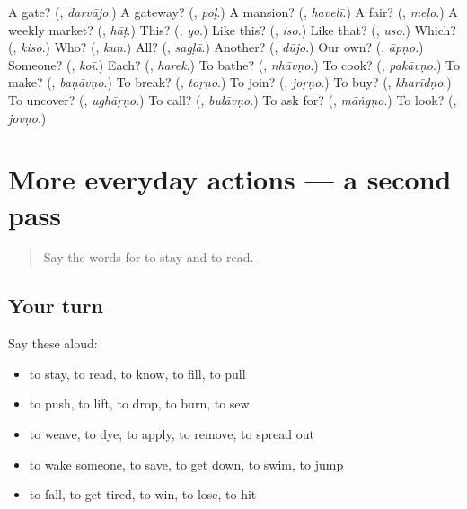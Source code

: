 \begin{tcolorbox}[breakable,colback=teal!4,colframe=teal!35!black,title={Before you move on}]
A gate? (\textbf{}, \emph{darvājo}.) A gateway? (\textbf{}, \emph{poḷ}.) A mansion? (\textbf{}, \emph{havelī}.) A fair? (\textbf{}, \emph{meḷo}.) A weekly market? (\textbf{}, \emph{hāṭ}.) This? (\textbf{}, \emph{yo}.) Like this? (\textbf{}, \emph{iso}.) Like that? (\textbf{}, \emph{uso}.) Which? (\textbf{}, \emph{kiso}.) Who? (\textbf{}, \emph{kuṇ}.) All? (\textbf{}, \emph{sagḷā}.) Another? (\textbf{}, \emph{dūjo}.) Our own? (\textbf{}, \emph{āpṇo}.) Someone? (\textbf{}, \emph{koī}.) Each? (\textbf{}, \emph{harek}.) To bathe? (\textbf{}, \emph{nhāvṇo}.) To cook? (\textbf{}, \emph{pakāvṇo}.) To make? (\textbf{}, \emph{baṇāvṇo}.) To break? (\textbf{}, \emph{toṛṇo}.) To join? (\textbf{}, \emph{joṛṇo}.) To buy? (\textbf{}, \emph{kharīdṇo}.) To uncover? (\textbf{}, \emph{ughāṛṇo}.) To call? (\textbf{}, \emph{bulāvṇo}.) To ask for? (\textbf{}, \emph{māṅgṇo}.) To look? (\textbf{}, \emph{jovṇo}.)
\end{tcolorbox}
\section[(dialogue)]{More everyday actions — a second pass}

\label{lesson:MW-R109-second-pass-more-everyday-actions}



\begin{quote}
Say the words for to stay and to read.
\end{quote}

\subsection*{Your turn}
Say these aloud:

\begin{itemize}
\raggedright
  \item to stay, to read, to know, to fill, to pull
  \item to push, to lift, to drop, to burn, to sew
  \item to weave, to dye, to apply, to remove, to spread out
  \item to wake someone, to save, to get down, to swim, to jump
  \item to fall, to get tired, to win, to lose, to hit
\end{itemize}

